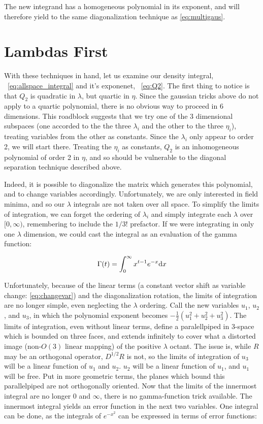 \documentclass[10pt,letterpaper]{article}
\def\d{{\rm d}}  %
\begin{document}
The new integrand has a homogeneous polynomial in its exponent, and will therefore yield to the same diagonalization technique as \ref{eq:multigaus}.

\section{Lambdas First} \label{lambdasec}

With these techniques in hand, let us examine our density integral, ~\ref{eq:allspace_integral} and it's exponenet, ~\ref{eq:Q2}. The first thing to notice is that $Q_2$ is quadratic in $\lambda$, but quartic in $\eta$. Since the gaussian tricks above do not apply to a quartic polynomial, there is no obvious way to proceed in 6 dimensions. This roadblock suggests that we try one of the 3 dimensional subspaces (one accorded to the the three $\lambda_i$ and the other to the three $\eta_i$), treating variables from the other as constants. Since the $\lambda_i$ only appear to order 2, we will start there. Treating the $\eta_i$ as constants, $Q_2$ is an inhomogeneous polynomial of order 2 in $\eta$, and so should be vulnerable to the diagonal separation technique described above.
\par Indeed, it is possible to diagonalize the matrix which generates this polynomial, and to change variables accordingly. Unfortunately, we are only interested in field minima, and so our $\lambda$ integrals are not taken over all space. To simplify the limits of integration, we can forget the ordering of $\lambda_i$ and simply integrate each $\lambda$ over $[0,\infty)$, remembering to include the $1/3!$ prefactor. If we were integrating in only one $\lambda$ dimension, we could cast the integral as an evaluation of the gamma function:

\begin{equation} \label{eq:gamma}
\Gamma(t) = \int_{0}^{\infty} x^{t-1} e^{-x} \d x
\end{equation}

Unfortunately, because of the linear terms (a constant vector shift as variable change: \ref{eq:changevar}) and the diagonalization rotation, the limits of integration are no longer simple, even neglecting the $\lambda$ ordering. Call the new variables $u_1$, $u_2$, and $u_3$, in which the polynomial exponent becomes $-\frac{1}{2}(u_1^2 + u_2^2 + u_3^2)$. The limits of integration, even without linear terms, define a paralellpiped in 3-space which is bounded on three faces, and extends infinitely to cover what a distorted image (non-$O(3)$ linear mapping) of the positive  $\lambda$ octant. The issue is, while $R$ may be an orthogonal operator, $D^{1/2}R$ is not, so the limits of integration of $u_3$ will be a linear function of $u_1$ and $u_2$. $u_2$ will be a linear function of $u_1$, and $u_1$ will be free. Put in more geometric terms, the planes which bound this parallelpiped are not orthogonally oriented. Now that the limits of the innermost integral are no longer $0$ and $\infty$, there is no gamma-function trick available.  The innermost integral yields an error function in the next two variables. One integral can be done, as the integrals of $e^{-x^2}$ can be expressed in terms of error functions:
\end{document}
